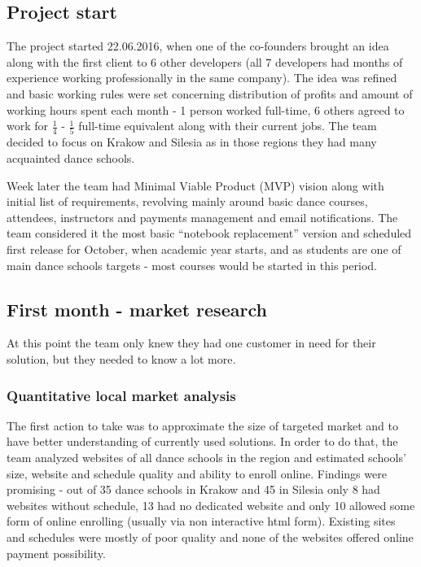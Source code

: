 \documentclass{article}
\begin{document}
\subsection{Project start}
The project started 22.06.2016, when one of the co-founders brought an idea along with the first client to 6 other developers (all 7 developers had months of experience working professionally in the same company). The idea was refined and basic working rules were set concerning distribution of profits and amount of working hours spent each month - 1 person worked full-time, 6 others agreed to work for \( \frac{1}{4} \) - \( \frac{1}{5} \) full-time equivalent along with their current jobs. The team decided to focus on Krakow and Silesia as in those regions they had many acquainted dance schools.

Week later the team had Minimal Viable Product (MVP) vision along with initial list of requirements, revolving mainly around basic dance courses, attendees, instructors and payments management and email notifications. The team considered it the most basic ``notebook replacement'' version and scheduled first release for October, when academic year starts, and as students are one of main dance schools targets - most courses would be started in this period.

\subsection{First month - market research}
At this point the team only knew they had one customer in need for their solution, but they needed to know a lot more.

\subsubsection{Quantitative local market analysis}
The first action to take was to approximate the size of targeted market and to have better understanding of currently used solutions. In order to do that, the team analyzed websites of all dance schools in the region and estimated schools' size, website and schedule quality and ability to enroll online. Findings were promising - out of 35 dance schools in Krakow and 45 in Silesia only 8 had websites without schedule, 13 had no dedicated website and only 10 allowed some form of online enrolling (usually via non interactive html form). Existing sites and schedules were mostly of poor quality and none of the websites offered online payment possibility.
\end{document}
